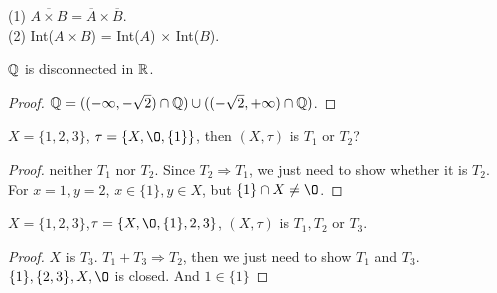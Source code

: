 \begin{exercise}{}{}
    (1) $\overline{A\times B}=\overline{A}\times \overline{B}$.\\
    (2) Int($A\times B$) = Int($A$) $\times$ Int($B$).
\end{exercise}

\begin{exercise}{}{}
    $\mathbb{Q}$ is disconnected in $\mathbb{R}$.
\end{exercise}

\begin{proof}
    $\mathbb{Q}=((-\infty, -\sqrt{2})\cap \mathbb{Q})\cup ((-\sqrt{2},+\infty)\cap \mathbb{Q})$.
\end{proof}


\begin{exercise}{}{}
    $X=\{1,2,3\}$, $\tau=\{X,\O,\{1\}\}$, then $(X,\tau)$ is $T_1$ or $T_2$?
\end{exercise}

\begin{proof}
    neither $T_1$ nor $T_2$. Since $T_2\Rightarrow T_1$,
    we just need to show whether it is $T_2$.
    For $x=1,y=2$, $x\in \{1\},y\in X$, but $\{1\}\cap X\neq \O$.
\end{proof}

\begin{exercise}{}{}
    $X=\{1,2,3\}$,$\tau=\{X,\O,\{1\},{2,3}\}$, $(X,\tau)$ is $T_1,T_2$ or $T_3$.
\end{exercise}

\begin{proof}
    $X$ is $T_3$.
    $T_1+T_3\Rightarrow T_2$, then we just need to show $T_1$ and $T_3$.
    $\{1\},\{2,3\},X,\O$ is closed. And $1\in \{1\}$
\end{proof}



